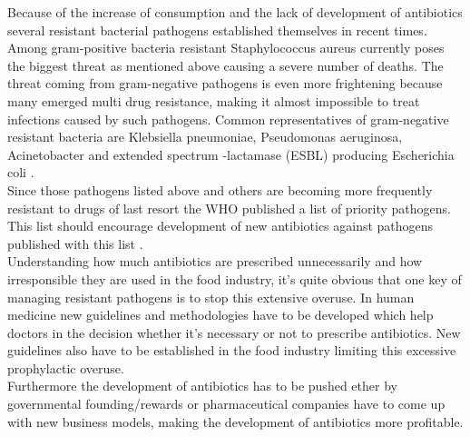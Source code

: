 Because of the increase of consumption and the lack of development of antibiotics several resistant bacterial pathogens established themselves in recent times. 
Among gram-positive bacteria resistant Staphylococcus aureus currently poses the biggest threat \cite{ventola_antibiotic_2015} as mentioned above causing a severe number of deaths. The threat coming from gram-negative pathogens is even more frightening because many emerged multi drug resistance, making it almost impossible to treat infections caused by such pathogens. Common representatives of gram-negative resistant bacteria are Klebsiella pneumoniae, Pseudomonas aeruginosa, Acinetobacter \cite{ventola_antibiotic_2015} and extended spectrum \textbeta-lactamase (ESBL) producing Escherichia coli \cite{fair_antibiotics_2014}.\\
Since those pathogens listed above and others are becoming more frequently resistant to drugs of last resort the WHO published a list of priority pathogens. This list should encourage development of new antibiotics against pathogens published with this list \cite{noauthor_who_nodate}.\\
Understanding how much antibiotics are prescribed unnecessarily and how irresponsible they are used in the food industry, it's quite obvious that one key of managing resistant pathogens is to stop this extensive overuse. In human medicine new guidelines and methodologies have to be developed which help doctors in the decision whether it's necessary or not to prescribe antibiotics. New guidelines also have to be established in the food industry limiting this excessive prophylactic overuse. \\
Furthermore the development of antibiotics has to be pushed ether by governmental founding/rewards or pharmaceutical companies have to come up with new business models, making the development of antibiotics more profitable.
\newpage


